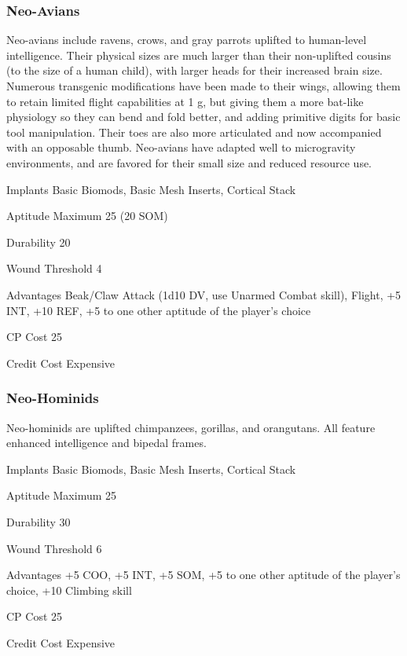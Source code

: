 \subsubsection{Neo-Avians}
\label{sec:starting-neo-avians}

Neo-avians include ravens, crows, and gray parrots uplifted to human-level intelligence. Their physical sizes are much larger than their non-uplifted cousins (to the size of a human child), with larger heads for their increased brain size. Numerous transgenic modifications have been made to their wings, allowing them to retain limited flight capabilities at 1 g, but giving them a more bat-like physiology so they can bend and fold better, and adding primitive digits for basic tool manipulation. Their toes are also more articulated and now accompanied with an opposable thumb. Neo-avians have adapted well to microgravity environments, and are favored for their small size and reduced resource use.

\begin{description*}
\item[Implants] Basic Biomods, Basic Mesh Inserts, Cortical Stack
\item[Aptitude Maximum] 25 (20 SOM) 
\item[Durability] 20 
\item[Wound Threshold] 4 
\item[Advantages] Beak/Claw Attack (1d10 DV, use Unarmed Combat skill), Flight, +5 INT, +10 REF, +5 to one other aptitude of the player’s choice
\item[CP Cost] 25 
\item[Credit Cost] Expensive 
\end{description*}

\subsubsection{Neo-Hominids}
\label{sec:starting-neo-hominids}

Neo-hominids are uplifted chimpanzees, gorillas, and orangutans. All feature enhanced intelligence and bipedal frames.

\begin{description*}
\item[Implants] Basic Biomods, Basic Mesh Inserts, Cortical Stack 
\item[Aptitude Maximum] 25 
\item[Durability] 30 
\item[Wound Threshold] 6 
\item[Advantages] +5 COO, +5 INT, +5 SOM, +5 to one other aptitude of the player’s choice, +10 Climbing skill
\item[CP Cost] 25 
\item[Credit Cost] Expensive 
\end{description*}

